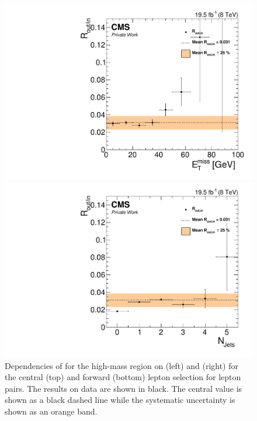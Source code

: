 \begin{figure}[htbp]
\begin{minipage}[t]{0.49\textwidth}
  \includegraphics[width=\textwidth]{plots/BG/rOutIn/rOutInSyst_DrellYanControlForward_Full2012_MET_HighMass_EE_None.pdf}
\end{minipage}
\begin{minipage}[t]{0.49\textwidth}
\includegraphics[width=\textwidth]{plots/BG/rOutIn/rOutInSyst_DrellYanControlForward_Full2012_NJets_HighMass_EE_None.pdf}
\end{minipage}
\caption{Dependencies of \Routin for the high-mass region on \MET (left) and \njets (right) for the central (top) and forward (bottom) lepton selection for \EE lepton pairs. The results on data are shown in black. The central value is shown as a black dashed line while the systematic uncertainty is shown as an orange band.}
\label{fig:ROutInDependencies4}
\end{figure} 

